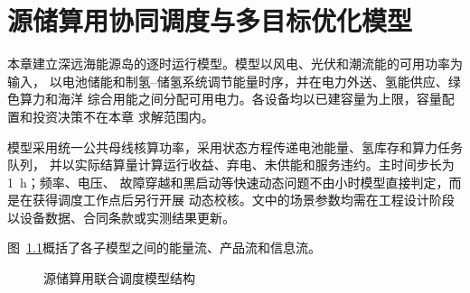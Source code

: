 \setcounter{chapter}{3}
\chapter{源储算用协同调度与多目标优化模型}
\label{chap:model}

本章建立深远海能源岛的逐时运行模型。模型以风电、光伏和潮流能的可用功率为输入，
以电池储能和制氢--储氢系统调节能量时序，并在电力外送、氢能供应、绿色算力和海洋
综合用能之间分配可用电力。各设备均以已建容量为上限，容量配置和投资决策不在本章
求解范围内。

模型采用统一公共母线核算功率，采用状态方程传递电池能量、氢库存和算力任务队列，
并以实际结算量计算运行收益、弃电、未供能和服务违约。主时间步长为1~h；频率、电压、
故障穿越和黑启动等快速动态问题不由小时模型直接判定，而是在获得调度工作点后另行开展
动态校核。文中的场景参数均需在工程设计阶段以设备数据、合同条款或实测结果更新。

图~\ref{fig:ch4-model-architecture}概括了各子模型之间的能量流、产品流和信息流。
\begin{figure}[H]
\centering
\resizebox{0.94\textwidth}{!}{}
\caption{源储算用联合调度模型结构}
\label{fig:ch4-model-architecture}
\end{figure}











